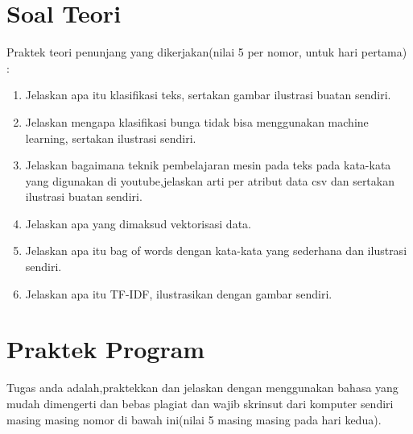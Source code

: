 \section{Soal Teori}
Praktek teori penunjang yang dikerjakan(nilai 5 per nomor, untuk hari pertama) :
\begin{enumerate}
\item
Jelaskan apa itu klasifikasi teks, sertakan gambar ilustrasi buatan sendiri.
\item
Jelaskan mengapa klasifikasi bunga tidak bisa menggunakan machine learning, sertakan ilustrasi sendiri.
\item
Jelaskan bagaimana teknik pembelajaran mesin pada teks pada kata-kata yang digunakan di youtube,jelaskan arti per atribut data csv dan sertakan ilustrasi buatan sendiri.
\item
Jelaskan apa yang dimaksud vektorisasi data.
\item
Jelaskan apa itu bag of words dengan kata-kata yang sederhana dan ilustrasi sendiri.
\item
Jelaskan apa itu TF-IDF, ilustrasikan dengan gambar sendiri.
\end{enumerate}



\section{Praktek Program}
Tugas anda adalah,praktekkan dan jelaskan dengan menggunakan bahasa yang mudah dimengerti dan bebas plagiat dan wajib skrinsut dari komputer sendiri masing masing nomor di bawah ini(nilai 5 masing masing pada hari kedua).

